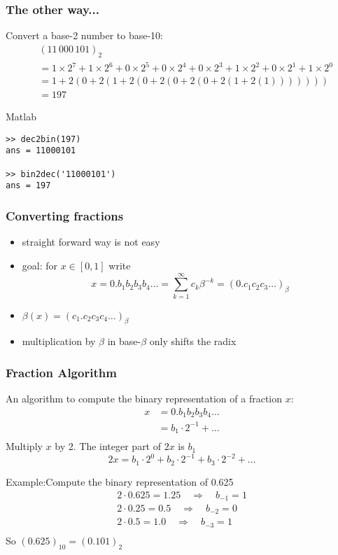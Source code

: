 \documentclass[10pt]{beamer}
\begin{document}
\begin{frame}[fragile]
\frametitle{The other way...}
  Convert a base-2 number to base-10:
\begin{align*}
  &(11\,000\,101)_2 \\
& = 
1\times 2^7 +
1\times 2^6 +
0\times 2^5 +
0\times 2^4 +
0\times 2^3 +
1\times 2^2 +
0\times 2^1 +
1\times 2^0\\
& = 1 + 2(0 + 2(1 + 2(0 + 2(0 + 2(0 + 2(1 + 2(1)))))))\\
& = 197
\end{align*}

\begin{block}{Matlab}
\begin{lstlisting}
>> dec2bin(197)
ans = 11000101

>> bin2dec('11000101')
ans = 197
\end{lstlisting}
\end{block}
\end{frame}
\begin{frame}
\frametitle{Converting fractions}
\begin{itemize}
  \item straight forward way is not easy
  \item goal: for $x\in[0,1]$ write
  \begin{equation*}
    x = 0.b_1b_2b_3b_4\dots = \sum_{k=1}^{\infty} c_k \beta^{-k} =
(0.c_1c_2c_3\dots )_{\beta}
\end{equation*}
  \item $\beta(x) = (c_1.c_2c_3c_4\dots)_{\beta}$
  \item multiplication by $\beta$ in base-$\beta$ only shifts the radix
\end{itemize}
\end{frame}
\begin{frame}[shrink]
\frametitle{Fraction Algorithm}
An algorithm to compute the binary representation of a fraction $x$:
\begin{align*}
x &= 0.b_1b_2b_3b_4\dots\\
& = b_1\cdot 2^{-1} + \dots\\
\end{align*}
Multiply $x$ by 2.  The integer part of $2x$ is $b_1$
\begin{equation*}
2x = b_1\cdot 2^0 + b_2\cdot 2^{-1} + b_3\cdot 2^{-2} + \dots
\end{equation*}
\begin{example}{Example:Compute the binary representation of 0.625}
\begin{align*}
2\cdot 0.625 = 1.25 \quad\Rightarrow\quad b_{-1} = 1\\
2\cdot 0.25 = 0.5 \quad\Rightarrow\quad b_{-2} = 0\\
2\cdot 0.5 = 1.0 \quad\Rightarrow\quad b_{-3} = 1\\
\end{align*}
So $(0.625)_{10} = (0.101)_{2}$
\end{example}
\end{frame}
\end{document}
